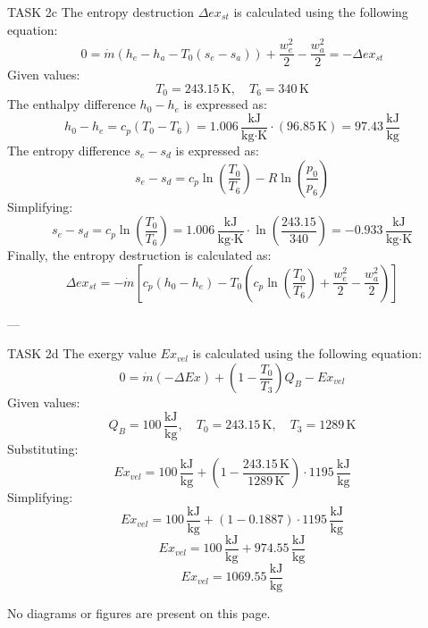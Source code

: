 TASK 2c  
The entropy destruction \( \Delta ex_{st} \) is calculated using the following equation:  
\[
0 = \dot{m} (h_e - h_a - T_0 (s_e - s_a)) + \frac{w_e^2}{2} - \frac{w_a^2}{2} = -\Delta ex_{st}
\]  
Given values:  
\[
T_0 = 243.15 \, \text{K}, \quad T_6 = 340 \, \text{K}
\]  
The enthalpy difference \( h_0 - h_e \) is expressed as:  
\[
h_0 - h_e = c_p (T_0 - T_6) = 1.006 \, \frac{\text{kJ}}{\text{kg·K}} \cdot (96.85 \, \text{K}) = 97.43 \, \frac{\text{kJ}}{\text{kg}}
\]  
The entropy difference \( s_e - s_d \) is expressed as:  
\[
s_e - s_d = c_p \ln \left( \frac{T_0}{T_6} \right) - R \ln \left( \frac{p_0}{p_6} \right)
\]  
Simplifying:  
\[
s_e - s_d = c_p \ln \left( \frac{T_0}{T_6} \right) = 1.006 \, \frac{\text{kJ}}{\text{kg·K}} \cdot \ln \left( \frac{243.15}{340} \right) = -0.933 \, \frac{\text{kJ}}{\text{kg·K}}
\]  
Finally, the entropy destruction is calculated as:  
\[
\Delta ex_{st} = -\dot{m} \left[ c_p (h_0 - h_e) - T_0 \left( c_p \ln \left( \frac{T_0}{T_6} \right) + \frac{w_e^2}{2} - \frac{w_a^2}{2} \right) \right]
\]  

---

TASK 2d  
The exergy value \( Ex_{vel} \) is calculated using the following equation:  
\[
0 = \dot{m} (-\Delta Ex) + \left( 1 - \frac{T_0}{T_3} \right) Q_B - Ex_{vel}
\]  
Given values:  
\[
Q_B = 100 \, \frac{\text{kJ}}{\text{kg}}, \quad T_0 = 243.15 \, \text{K}, \quad T_3 = 1289 \, \text{K}
\]  
Substituting:  
\[
Ex_{vel} = 100 \, \frac{\text{kJ}}{\text{kg}} + \left( 1 - \frac{243.15 \, \text{K}}{1289 \, \text{K}} \right) \cdot 1195 \, \frac{\text{kJ}}{\text{kg}}
\]  
Simplifying:  
\[
Ex_{vel} = 100 \, \frac{\text{kJ}}{\text{kg}} + \left( 1 - 0.1887 \right) \cdot 1195 \, \frac{\text{kJ}}{\text{kg}}
\]  
\[
Ex_{vel} = 100 \, \frac{\text{kJ}}{\text{kg}} + 974.55 \, \frac{\text{kJ}}{\text{kg}}
\]  
\[
Ex_{vel} = 1069.55 \, \frac{\text{kJ}}{\text{kg}}
\]  

No diagrams or figures are present on this page.
